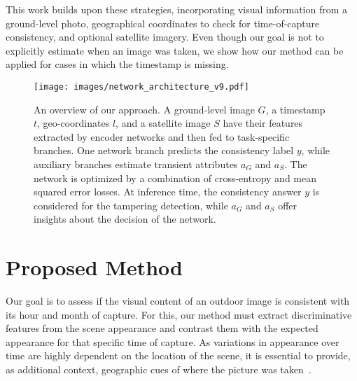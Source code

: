 \documentclass[journal]{IEEEtran}
\begin{document}
        This work builds upon these strategies, incorporating visual information from a ground-level photo, geographical coordinates to check for time-of-capture consistency, and optional satellite imagery. Even though our goal is not to explicitly estimate when an image was taken, we show how our method can be applied for cases in which the timestamp is missing.



    \begin{figure*}\centering
        \texttt{[image: images/network\_architecture\_v9.pdf]}
        \caption{An overview of our approach. A ground-level image $G$, a timestamp $t$, geo-coordinates $l$, and a satellite image $S$ have their features extracted by encoder networks and then fed to task-specific branches. One network branch predicts the consistency label $y$, while auxiliary branches estimate transient attributes $a_{G}$ and $a_{S}$. The network is optimized by a combination of cross-entropy and mean squared error losses.  At inference time, the consistency answer $y$ is considered for the tampering detection, while $a_{G}$ and $a_{S}$ offer insights about the decision of the network.}
        \label{fig:architecture}
    \end{figure*}

\section{Proposed Method}
    Our goal is to assess if the visual content of an outdoor image is consistent with its hour and month of capture. For this, our method must extract discriminative features from the scene appearance and contrast them with the expected appearance for that specific time of capture. As variations in appearance over time are highly dependent on the location of the scene, it is essential to provide, as additional context, geographic cues of where the picture was taken~\cite{salem2020learning, zhai2018geotemporal}.  
    
\end{document}
